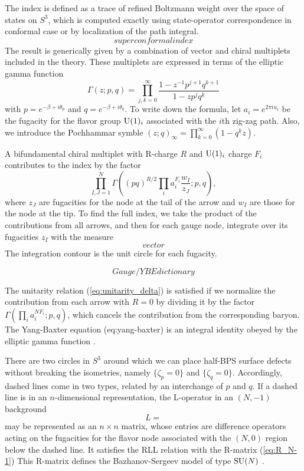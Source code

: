 The index is defined as a trace of refined Boltzmann weight over the
space of states on $S^{3}$, which is computed exactly using state-operator
correspondence in conformal case or by localization of the path integral.
\begin{equation}
    superconformalindex
\end{equation}
The result is generically given by a combination of vector and chiral
multiplets included in the theory. These multiplets are expressed
in terms of the elliptic gamma function 
\begin{equation}
    \Gamma\left(z;p,q\right)  =  \prod_{j,k=0}^{\infty}  \frac{1-z^{-1}p^{j+1}q^{k+1}}{1-zp^{j}q^{k}}
\end{equation}
with $p=e^{-\beta+i\theta_{p}}$ and $q=e^{-\beta+i\theta_{q}}$.
To write down the formula, let $a_{i}=e^{2\pi iu_{i}}$ be the fugacity
for the flavor group $\mathrm{U}(1)_i$ associated with the $i$th zig-zag path.
Also, we introduce the Pochhammar symble $\left(z;q\right)_{\infty}=\prod_{k=0}^{\infty}\left(1-q^{k}z\right)$. 

A bifundamental chiral multiplet with R-charge $R$ and $\mathrm{U}(1)_i$ charge
$F_{i}$ contributes to the index by the factor
\begin{equation}
    \prod_{I,J=1}^{N}  \Gamma\left((pq)^{R/2}\prod_{i}a_{i}^{F_{i}}\frac{w_{I}}{z_{J}};p,q\right),
\end{equation}
 where $z_{J}$ are fugacities for the node at the tail of the arrow
and $w_{I}$ are those for the node at the tip. To find the full index,
we take the product of the contributions from all arrows, and then
for each gauge node, integrate over its fugacities $z_{I}$ with the
measure
\begin{equation}
vector
\end{equation}
 The integration contour is the unit circle for each fugacity. 

\[
Gauge/YBEdictionary
\]

The unitarity relation (\ref{eq:unitarity_delta}) is satisfied if
we normalize the contribution from each arrow with $R=0$ by dividing
it by the factor $\Gamma(\prod_{i}a_{i}^{NF_{i}};p,q)$, which cancels
the contribution from the corresponding baryon. The Yang-Baxter equation
(eq:yang-baxter) is an integral identity obeyed by the elliptic gamma
function \cite{MR2044635,MR2630038,Dolan:2008qi}. 

There are two circles in $S^{3}$ around which we can place half-BPS
surface defects without breaking the isometries, namely $\{\zeta_{p}=0\}$
and $\{\zeta_{q}=0\}$. Accordingly, dashed lines come in two types,
related by an interchange of $p$ and $q$. If a dashed line is in
an $n$-dimensional representation, the L-operator in an $\left( N,-1 \right)$
background 
\begin{equation}
L=
\end{equation}
may be represented as an $n \times n$ matrix, whose entries are difference
operators acting on the fugacities for the flavor node associated
with the $\left( N,0 \right)$ region below the dashed line. It satisfies
the RLL relation with the R-matrix (\ref{eq:R_N-1}) This R-matrix
defines the Bazhanov-Sergeev model of type $\mathrm{SU}(N)$ \cite{Bazhanov:2010kz,Bazhanov:2011mz}. 

